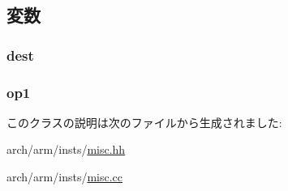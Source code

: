 \subsection{変数}
\hypertarget{classRegRegOp_aec72e8e45bdc87abeeeb75d2a8a9a716}{
\subsubsection[{dest}]{ {\bf dest}}}
\label{classRegRegOp_aec72e8e45bdc87abeeeb75d2a8a9a716}
\hypertarget{classRegRegOp_a4c465c43ad568f8bcf8ae71480e9cfea}{
\subsubsection[{op1}]{ {\bf op1}}}
\label{classRegRegOp_a4c465c43ad568f8bcf8ae71480e9cfea}


このクラスの説明は次のファイルから生成されました:\begin{DoxyCompactItemize}
\item 
arch/arm/insts/\hyperlink{arch_2arm_2insts_2misc_8hh}{misc.hh}\item 
arch/arm/insts/\hyperlink{arch_2arm_2insts_2misc_8cc}{misc.cc}\end{DoxyCompactItemize}
